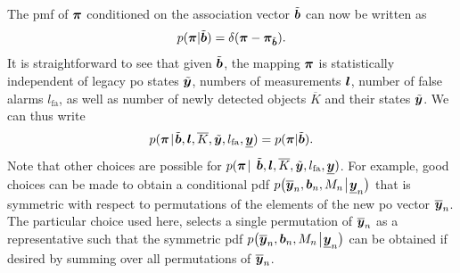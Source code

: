 \documentclass[11pt,a4paper]{article}
\newcommand{\ist}{\hspace*{.3mm}}
\begin{document}
\begin{enumerate}
The \ac{pmf} of $\bm{\pi}$ conditioned on the association vector $\tilde{\bm{b}}$ can now be written \vspace{-1.5mm} as 
\begin{equation}
p(\V{\pi} | \tilde{\V{b}}) = \delta (\V{\pi} - \V{\pi}_{\tilde{\V{b}}}).
\label{eq:mapping1}
\vspace{.1mm}
\end{equation}
It is straightforward to see that given $\tilde{\bm{b}}$, the mapping $\bm{\pi}$ is statistically independent of legacy \ac{po} states $\tilde{\bm{y}}$, numbers of measurements $\bm{l}$, number of false alarms $l_{\mathrm{fa}}$, as well as number of newly detected objects $\overline{K}$ and their states $\tilde{\bm{y}}$. We can thus \vspace{-1mm} write
\begin{equation}
p( \V{\pi} \ist | \ist \tilde{\V{b}}, \V{l}, \overline{K}, \tilde{\V{y}},  l_{\mathrm{fa}},  \underline{\V{y}}) = p(\V{\pi} | \tilde{\V{b}}).
\label{eq:mapping2}
\end{equation}
Note that other choices are possible for  $p( \V{\pi} \ist |$ $\tilde{\bm{b}}, \bm{l}, \overline{K},\tilde{\bm{y}},  l_{\mathrm{fa}}, \underline{\bm{y}})$. For example, good choices can be made to obtain a conditional \ac{pdf} $p \big (\overline{\V{y}}_n, \V{b}_n, M_n \ist \big | \ist \underline{\V{y}}_n \big)$ that is symmetric with respect to permutations of the elements of the new \ac{po} vector $\overline{\bm{y}}_n$. The particular choice used here, selects a single permutation of $\overline{\bm{y}}_n$ as a representative such that the symmetric \ac{pdf} $p \big (\overline{\V{y}}_n, \V{b}_n, M_n \ist \big | \ist \underline{\V{y}}_n \big)$  can be obtained if desired by summing over all permutations of $\overline{\bm{y}}_n$.


\end{enumerate}
\end{document}
